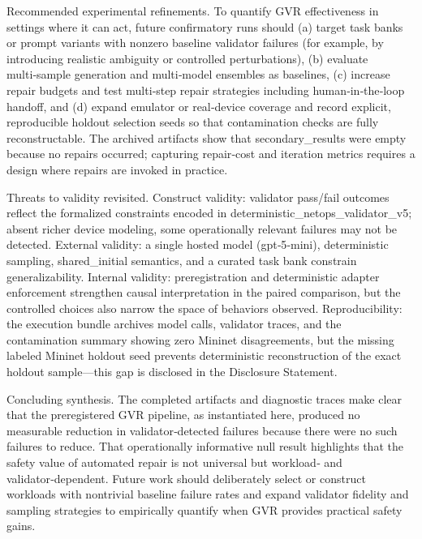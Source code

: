 \documentclass[conference]{IEEEtran}
\begin{document}
Recommended experimental refinements. To quantify GVR effectiveness in settings where it can act, future confirmatory runs should (a) target task banks or prompt variants with nonzero baseline validator failures (for example, by introducing realistic ambiguity or controlled perturbations), (b) evaluate multi‑sample generation and multi‑model ensembles as baselines, (c) increase repair budgets and test multi‑step repair strategies including human‑in‑the‑loop handoff, and (d) expand emulator or real‑device coverage and record explicit, reproducible holdout selection seeds so that contamination checks are fully reconstructable. The archived artifacts show that secondary\_results were empty because no repairs occurred; capturing repair‑cost and iteration metrics requires a design where repairs are invoked in practice.

Threats to validity revisited. Construct validity: validator pass/fail outcomes reflect the formalized constraints encoded in deterministic\_netops\_validator\_v5; absent richer device modeling, some operationally relevant failures may not be detected. External validity: a single hosted model (gpt‑5‑mini), deterministic sampling, shared\_initial semantics, and a curated task bank constrain generalizability. Internal validity: preregistration and deterministic adapter enforcement strengthen causal interpretation in the paired comparison, but the controlled choices also narrow the space of behaviors observed. Reproducibility: the execution bundle archives model calls, validator traces, and the contamination summary showing zero Mininet disagreements, but the missing labeled Mininet holdout seed prevents deterministic reconstruction of the exact holdout sample---this gap is disclosed in the Disclosure Statement.

Concluding synthesis. The completed artifacts and diagnostic traces make clear that the preregistered GVR pipeline, as instantiated here, produced no measurable reduction in validator‑detected failures because there were no such failures to reduce. That operationally informative null result highlights that the safety value of automated repair is not universal but workload‑ and validator‑dependent. Future work should deliberately select or construct workloads with nontrivial baseline failure rates and expand validator fidelity and sampling strategies to empirically quantify when GVR provides practical safety gains.
\end{document}
